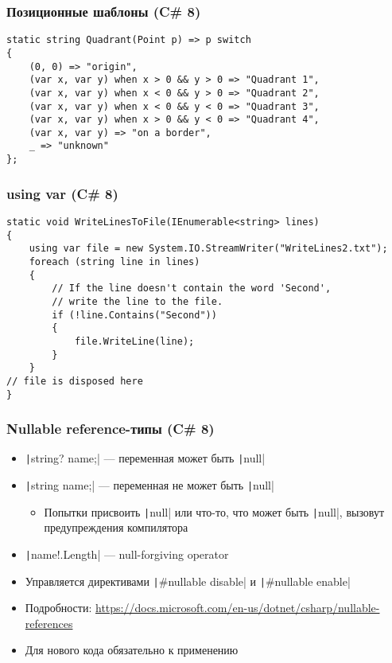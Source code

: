\documentclass[xetex,mathserif,serif]{beamer}
\begin{document}
    \begin{frame}[fragile]
        \frametitle{Позиционные шаблоны (C\# 8)}
        \begin{verbatim}
static string Quadrant(Point p) => p switch
{
    (0, 0) => "origin",
    (var x, var y) when x > 0 && y > 0 => "Quadrant 1",
    (var x, var y) when x < 0 && y > 0 => "Quadrant 2",
    (var x, var y) when x < 0 && y < 0 => "Quadrant 3",
    (var x, var y) when x > 0 && y < 0 => "Quadrant 4",
    (var x, var y) => "on a border",
    _ => "unknown"
};
        \end{verbatim}
    \end{frame}

    \begin{frame}[fragile]
        \frametitle{using var (C\# 8)}
        \begin{verbatim}
static void WriteLinesToFile(IEnumerable<string> lines)
{
    using var file = new System.IO.StreamWriter("WriteLines2.txt");
    foreach (string line in lines)
    {
        // If the line doesn't contain the word 'Second', 
        // write the line to the file.
        if (!line.Contains("Second"))
        {
            file.WriteLine(line);
        }
    }
// file is disposed here
}
        \end{verbatim}
    \end{frame}

    \begin{frame}[fragile]
        \frametitle{Nullable reference-типы (C\# 8)}
        \begin{itemize}
            \item \texttt|string? name;| --- переменная может быть \texttt|null|
            \item \texttt|string name;| --- переменная не может быть \texttt|null|
            \begin{itemize}
                \item Попытки присвоить \texttt|null| или что-то, что может быть \texttt|null|, вызовут предупреждения компилятора
            \end{itemize}
            \item \texttt|name!.Length| --- null-forgiving operator
            \item Управляется директивами \texttt|#nullable disable| и \texttt|#nullable enable|
            \item Подробности: \url{https://docs.microsoft.com/en-us/dotnet/csharp/nullable-references}
            \item Для нового кода обязательно к применению
        \end{itemize}
    \end{frame}
\end{document}
